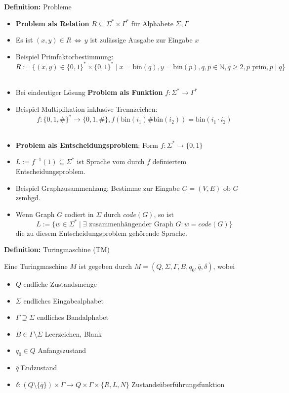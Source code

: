 \documentclass[a4paper,graphics,11pt]{article}
\newcommand{\Iff}[0]{\,\Longleftrightarrow\,}
\begin{document}
\textbf{Definition:} Probleme
\begin{itemize}
    \item \textbf{Problem als Relation} $R \subseteq \Sigma^* \times \Gamma^*$ für Alphabete $\Sigma, \Gamma$
    \item Es ist $(x,y) \in R \Iff y$ ist zulässige Ausgabe zur Eingabe $x$
    \item Beispiel Primfaktorbestimmung:
        $$
            R := \{(x,y) \in \{0,1\}^* \times \{0,1\}^* \mid x = \text{bin}(q), y = \text{bin}(p), q,p \in \mathbb{N},
            q\geq 2, p \text{ prim}, p \mid q\}
        $$
        \\
    \item Bei eindeutiger Lösung \textbf{Problem als Funktion} $f: \Sigma^* \to \Gamma^*$
    \item Beispiel Multiplikation inklusive Trennzeichen:
        $$
            f : \{0,1,\#\}^* \to \{0,1,\#\}, f(\text{bin}(i_1)\#\text{bin}(i_2)) = \text{bin}(i_1 \cdot i_2)
        $$
        \\
    \item \textbf{Problem als Entscheidungsproblem}: Form $f : \Sigma^* \to \{0,1\}$
    \item $L := f^{-1}(1) \subseteq \Sigma^*$ ist Sprache vom durch $f$ definiertem Entscheidungsproblem.
    \item Beispiel Graphzusammenhang: Bestimme zur Eingabe $G = (V,E)$ ob $G$ zsmhgd.
    \item Wenn Graph $G$ codiert in $\Sigma$ durch $code(G)$, so ist
        $$
            L := \{w \in \Sigma^* \mid \exists \text{ zusammenhängender Graph } G: w = code(G)\}
        $$
        die zu diesem Entscheidungsproblem gehörende Sprache.
\end{itemize}
\newpage


\textbf{Definition:} Turingmaschine (TM)

Eine Turingmaschine $M$ ist gegeben durch $M = (Q, \Sigma, \Gamma, B, q_0, \overline{q}, \delta)$, wobei
\begin{itemize}
    \item $Q$ endliche Zustandsmenge
    \item $\Sigma$ endliches Eingabealphabet
    \item $\Gamma \supsetneq \Sigma$ endliches Bandalphabet
    \item $B \in \Gamma \setminus \Sigma$ Leerzeichen, Blank
    \item $q_0 \in Q$ Anfangszustand
    \item $\overline{q}$ Endzustand
    \item $\delta : (Q \setminus \{\overline{q}\}) \times \Gamma \to Q \times \Gamma \times \{R, L, N\}$
        Zustandsüberführungsfunktion
\end{itemize}
\end{document}
